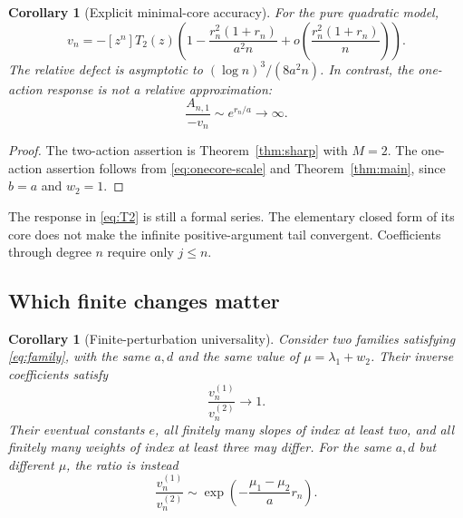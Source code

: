 \documentclass[11pt,a4paper]{article}
\numberwithin{equation}{section}
\newtheorem{corollary}[theorem]{Corollary}
\theoremstyle{definition}
\theoremstyle{remark}
\begin{document}
\begin{corollary}[Explicit minimal-core accuracy]
\label{cor:minimalcore}
For the pure quadratic model,
\begin{equation}
 v_n=-[z^n]T_2(z)
 \left(1-\frac{r_n^2(1+r_n)}{a^2n}
                 +o\!\left(\frac{r_n^2(1+r_n)}n\right)\right).
 \label{eq:two-core-error}
\end{equation}
The relative defect is asymptotic to $(\log n)^3/(8a^2n)$.
In contrast, the one-action response is not a relative approximation:
\begin{equation}
 \frac{A_{n,1}}{-v_n}\sim e^{r_n/a}\longrightarrow\infty.
 \label{eq:one-core-failure}
\end{equation}
\end{corollary}

\begin{proof}
The two-action assertion is Theorem~\ref{thm:sharp} with $M=2$.
The one-action assertion follows from \eqref{eq:onecore-scale} and
Theorem~\ref{thm:main}, since $b=a$ and $w_2=1$.
\end{proof}

The response in \eqref{eq:T2} is still a formal series. The elementary
closed form of its core does not make the infinite positive-argument tail
convergent. Coefficients through degree $n$ require only $j\le n$.

\subsection{Which finite changes matter}

\begin{corollary}[Finite-perturbation universality]
\label{cor:universality}
Consider two families satisfying \eqref{eq:family}, with the same $a,d$
and the same value of $\mu=\lambda_1+w_2$. Their inverse coefficients
satisfy
\begin{equation}
 \frac{v_n^{(1)}}{v_n^{(2)}}\longrightarrow1.
 \label{eq:universality}
\end{equation}
Their eventual constants $e$, all finitely many slopes of index at least
two, and all finitely many weights of index at least three may differ.
For the same $a,d$ but different $\mu$, the ratio is instead
\begin{equation}
 \frac{v_n^{(1)}}{v_n^{(2)}}
 \sim\exp\!\left(-\frac{\mu_1-\mu_2}{a}r_n\right).
 \label{eq:nonuniversal}
\end{equation}
\end{corollary}
\end{document}
